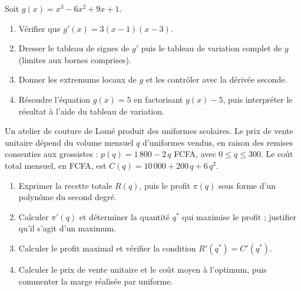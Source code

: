 \begin{exercice}
Soit $g(x) = x^{3} - 6x^{2} + 9x + 1$.
\begin{enumerate}
\item Vérifier que $g'(x) = 3(x - 1)(x - 3)$.
\item Dresser le tableau de signes de $g'$ puis le tableau de variation complet de $g$ (limites aux bornes comprises).
\item Donner les extremums locaux de $g$ et les contrôler avec la dérivée seconde.
\item Résoudre l'équation $g(x) = 5$ en factorisant $g(x) - 5$, puis interpréter le résultat à l'aide du tableau de variation.
\end{enumerate}
\end{exercice}

\begin{exercice}
Un atelier de couture de Lomé produit des uniformes scolaires. Le prix de vente unitaire dépend du volume mensuel $q$ d'uniformes vendus, en raison des remises consenties aux grossistes : $p(q) = 1\,800 - 2\,q$ FCFA, avec $0 \leq q \leq 300$. Le coût total mensuel, en FCFA, est $C(q) = 10\,000 + 200\,q + 6\,q^{2}$.
\begin{enumerate}
\item Exprimer la recette totale $R(q)$, puis le profit $\pi(q)$ sous forme d'un polynôme du second degré.
\item Calculer $\pi'(q)$ et déterminer la quantité $q^{*}$ qui maximise le profit ; justifier qu'il s'agit d'un maximum.
\item Calculer le profit maximal et vérifier la condition $R'(q^{*}) = C'(q^{*})$.
\item Calculer le prix de vente unitaire et le coût moyen à l'optimum, puis commenter la marge réalisée par uniforme.
\end{enumerate}
\end{exercice}
